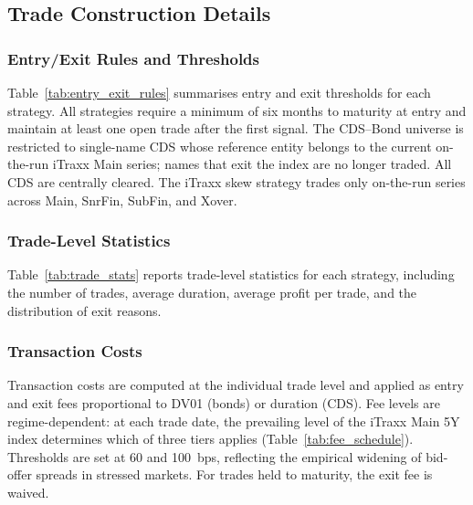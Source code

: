 \subsection{Trade Construction Details}
\label{app:trade_details}

\subsubsection{Entry/Exit Rules and Thresholds}
\label{app:entry_exit}
Table~\ref{tab:entry_exit_rules} summarises entry and exit thresholds
for each strategy. All strategies require a minimum of six months to
maturity at entry and maintain at least one open trade after the first
signal. The CDS--Bond universe is restricted to single-name CDS whose
reference entity belongs to the current on-the-run iTraxx Main series;
names that exit the index are no longer traded. All CDS are centrally
cleared. The iTraxx skew strategy trades only on-the-run series across
Main, SnrFin, SubFin, and Xover.



\subsubsection{Trade-Level Statistics}
\label{app:trade_stats}

Table~\ref{tab:trade_stats} reports trade-level statistics for each
strategy, including the number of trades, average duration, average
profit per trade, and the distribution of exit reasons.



\subsubsection{Transaction Costs}
\label{app:fees}
Transaction costs are computed at the individual trade level and applied
as entry and exit fees proportional to DV01 (bonds) or duration (CDS).
Fee levels are regime-dependent: at each trade date, the prevailing level
of the iTraxx Main 5Y index determines which of three tiers applies
(Table~\ref{tab:fee_schedule}). Thresholds are set at 60 and 100~bps,
reflecting the empirical widening of bid-offer spreads in stressed markets.
For trades held to maturity, the exit fee is waived.



